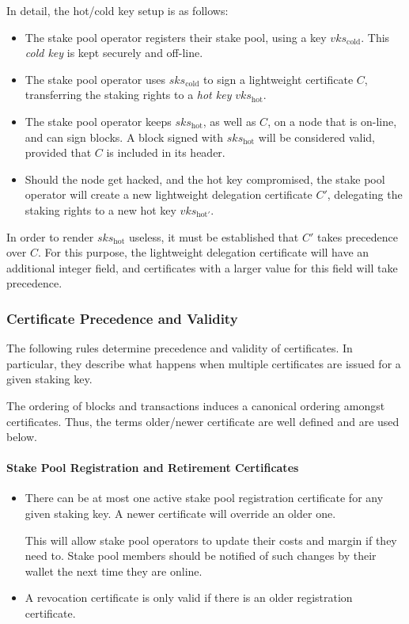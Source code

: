 \documentclass[11pt,a4paper]{article}
\begin{document}
In detail, the hot/cold key setup is as follows:

\begin{itemize}
\item
  The stake pool operator registers their stake pool, using a key
  \(vks_\text{cold}\). This \emph{cold key} is kept securely and
  off-line.
\item
  The stake pool operator uses \(sks_\text{cold}\) to sign a lightweight
  certificate \(C\), transferring the staking rights to a \emph{hot key}
  \(vks_\text{hot}\).
\item
  The stake pool operator keeps \(sks_\text{hot}\), as well as \(C\), on
  a node that is on-line, and can sign blocks. A block signed with
  \(sks_\text{hot}\) will be considered valid, provided that \(C\) is
  included in its header.
\item
  Should the node get hacked, and the hot key compromised, the stake
  pool operator will create a new lightweight delegation certificate
  \(C'\), delegating the staking rights to a new hot key
  \(vks_{\text{hot}'}\).
\end{itemize}

In order to render \(sks_\text{hot}\) useless, it must be established
that \(C'\) takes precedence over \(C\). For this purpose, the
lightweight delegation certificate will have an additional integer
field, and certificates with a larger value for this field will take
precedence.

\subsubsection{Certificate Precedence and Validity}
\label{certificate-precedence-and-validity}

The following rules determine precedence and validity of certificates.
In particular, they describe what happens when multiple certificates are
issued for a given staking key.

The ordering of blocks and transactions induces a canonical ordering
amongst certificates. Thus, the terms older/newer certificate are well
defined and are used below.

\paragraph{Stake Pool Registration and Retirement Certificates}
\label{stake-pool-registration-and-retirement-certificates}

\begin{itemize}
\item
  There can be at most one active stake pool registration certificate
  for any given staking key. A newer certificate will override an older
  one.

  This will allow stake pool operators to update their costs and margin
  if they need to. Stake pool members should be notified of such changes
  by their wallet the next time they are online.
\item
  A revocation certificate is only valid if there is an older
  registration certificate.
\end{itemize}
\end{document}
